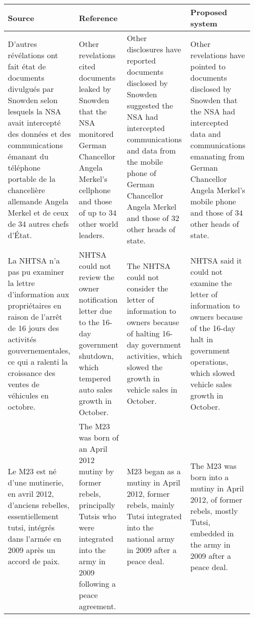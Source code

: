 \documentclass[11pt,a4paper]{article}
\begin{document}
\begin{table*}[t]
\begin{small}
\begin{center}
\addtolength{\tabcolsep}{-0.5pt}
  \begin{tabular}{p{3.82cm}p{3.46cm}p{3.48cm}p{3.67cm}}
    \toprule
    \bf Source & \bf Reference & \bf \citet{artetxe2018usmt} & \bf Proposed system \\
    \midrule
    D'autres révélations ont fait état de documents divulgués par Snowden selon lesquels la NSA avait intercepté des données et des communications émanant du téléphone portable de la chancelière allemande Angela Merkel et de ceux de 34 autres chefs d'État.
    & Other revelations cited documents leaked by Snowden that the NSA monitored German Chancellor Angela Merkel's cellphone and those of up to 34 other world leaders.
    & Other disclosures have reported documents disclosed by Snowden suggested the NSA had intercepted communications and data from the mobile phone of German Chancellor Angela Merkel and those of 32 other heads of state.
    & Other revelations have pointed to documents disclosed by Snowden that the NSA had intercepted data and communications emanating from German Chancellor Angela Merkel's mobile phone and those of 34 other heads of state.
    \\
    \midrule
	La NHTSA n'a pas pu examiner la lettre d'information aux propriétaires en raison de l'arrêt de 16 jours des activités gouvernementales, ce qui a ralenti la croissance des ventes de véhicules en octobre.
	& NHTSA could not review the owner notification letter due to the 16-day government shutdown, which tempered auto sales growth in October.
	& The NHTSA could not consider the letter of information to owners because of halting 16-day government activities, which slowed the growth in vehicle sales in October.
	& NHTSA said it could not examine the letter of information to owners because of the 16-day halt in government operations, which slowed vehicle sales growth in October.
	\\
    \midrule
    Le M23 est né d'une mutinerie, en avril 2012, d'anciens rebelles, essentiellement tutsi, intégrés dans l'armée en 2009 après un accord de paix.
    & The M23 was born of an April 2012 mutiny by former rebels, principally Tutsis who were integrated into the army in 2009 following a peace agreement.
    & M23 began as a mutiny in April 2012, former rebels, mainly Tutsi integrated into the national army in 2009 after a peace deal.
    & The M23 was born into a mutiny in April 2012, of former rebels, mostly Tutsi, embedded in the army in 2009 after a peace deal.

\end{tabular}
\end{center}
\end{small}
\end{table*}
\end{document}
